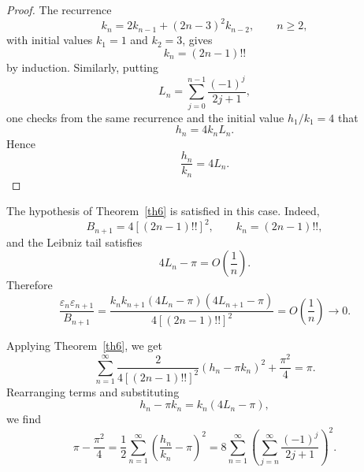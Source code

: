 \documentclass[]{interact}
\theoremstyle{plain}
\numberwithin{equation}{section} %
\numberwithin{table}{section} %
\numberwithin{figure}{section}
\begin{document}
\begin{proof}
The recurrence
\[
k_n=2k_{n-1}+(2n-3)^2k_{n-2},
\qquad n\ge2,
\]
with initial values \(k_1=1\) and \(k_2=3\), gives
\[
k_n=(2n-1)!!
\]
by induction. Similarly, putting
\[
L_n=\sum_{j=0}^{n-1}\frac{(-1)^j}{2j+1},
\]
one checks from the same recurrence and the initial value \(h_1/k_1=4\) that
\[
h_n=4k_nL_n.
\]
Hence
\[
\frac{h_n}{k_n}=4L_n.
\]
\end{proof}
The hypothesis of Theorem~\ref{th6} is satisfied in this case. Indeed,
\[
B_{n+1}=4[(2n-1)!!]^2,\qquad k_n=(2n-1)!!,
\]
and the Leibniz tail satisfies
\[
4L_n-\pi=O\left(\frac1n\right).
\]
Therefore
\[
\frac{\varepsilon_n\varepsilon_{n+1}}{B_{n+1}}
=
\frac{k_nk_{n+1}(4L_n-\pi)(4L_{n+1}-\pi)}
{4[(2n-1)!!]^2}
=
O\left(\frac1n\right)\to0.
\]

Applying Theorem~\ref{th6}, we get
\[
\sum_{n=1}^{\infty}
\frac{2}{4[(2n-1)!!]^2}
(h_n-\pi k_n)^2
+
\frac{\pi^2}{4}
=
\pi.
\]
Rearranging terms and substituting
\[
h_n-\pi k_n=k_n(4L_n-\pi),
\]
we find
\[
\pi-\frac{\pi^2}{4}
=
\frac12\sum_{n=1}^{\infty}
\left(\frac{h_n}{k_n}-\pi\right)^2
=
8\sum_{n=1}^{\infty}
\left(
\sum_{j=n}^{\infty}\frac{(-1)^j}{2j+1}
\right)^2.
\]
\end{document}
